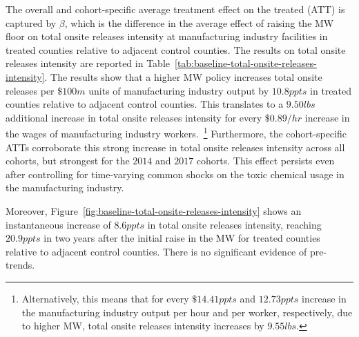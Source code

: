 \documentclass[12pt, english]{article}
\begin{document}
    The overall and cohort-specific average treatment effect on the treated (ATT) is captured by $\beta$, which is the difference in the average effect of raising the MW floor on total onsite releases intensity at manufacturing industry facilities in treated counties relative to adjacent control counties. The results on total onsite releases intensity are reported in Table~\ref{tab:baseline-total-onsite-releases-intensity}. The results show that a higher MW policy increases total onsite releases per $\$100m$ units of manufacturing industry output by $10.8ppts$ in treated counties relative to adjacent control counties. This translates to a $9.50lbs$ additional increase in total onsite releases intensity for every $\$0.89/hr$ increase in the wages of manufacturing industry workers.~\footnote{\tiny Alternatively, this means that for every $\$14.41ppts$ and $12.73ppts$ increase in the manufacturing industry output per hour and per worker, respectively, due to higher MW, total onsite releases intensity increases by $9.55lbs$.} Furthermore, the cohort-specific ATTs corroborate this strong increase in total onsite releases intensity across all cohorts, but strongest for the $2014$ and $2017$ cohorts. This effect persists even after controlling for time-varying common shocks on the toxic chemical usage in the manufacturing industry.
    

    Moreover, Figure~\ref{fig:baseline-total-onsite-releases-intensity} shows an instantaneous increase of $8.6ppts$ in total onsite releases intensity, reaching $20.9ppts$ in two years after the initial raise in the MW for treated counties relative to adjacent control counties. There is no significant evidence of pre-trends.
\end{document}
